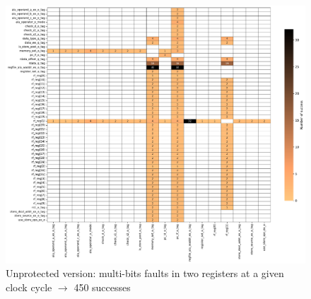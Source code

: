 \begin{frame}{}
    \begin{minipage}[c]{0.45\linewidth}
        \begin{figure}
            \centering
            \includegraphics[width=\textwidth]{src/5_results/img/heatmap_buffer_overflow_wop_1_multi_bitflip_reg_multi_2.pdf}
            \caption{Unprotected version: multi-bits faults in two registers at a given clock cycle $\rightarrow$ 450 successes}
            \label{fig:heatmap_multibit_1}
        \end{figure}
    \end{minipage}\hfill%
    \begin{minipage}[c]{0.55\linewidth}
\end{minipage}
\end{frame}
